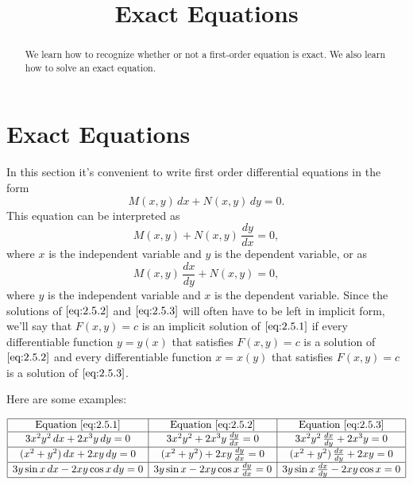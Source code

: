\documentclass{ximera}
\title{Exact Equations}
\begin{document}
 
\begin{abstract}
We learn how to recognize whether or not a first-order equation is exact.  We also learn how to solve an exact equation.
\end{abstract}
 
\maketitle
 
\section*{Exact Equations}
 
In this section it's convenient to write first order
differential equations in the form
\begin{equation} \label{eq:2.5.1}
M(x,y)\,dx+N(x,y)\,dy=0.
\end{equation}
This equation  can be interpreted as
\begin{equation} \label{eq:2.5.2}
M(x,y)+N(x,y)\,\frac{dy}{dx}=0,
\end{equation}
where $x$ is the independent variable and $y$ is the dependent
variable, or as
\begin{equation} \label{eq:2.5.3}
M(x,y)\,\frac{dx}{dy}+N(x,y)=0,
\end{equation}
where $y$ is the independent variable and $x$ is the dependent
variable. Since the solutions of $\eqref{eq:2.5.2}$ and $\eqref{eq:2.5.3}$ will
often have to be left in
implicit form, we'll say that $F(x,y)=c$ is an implicit solution of
$\eqref{eq:2.5.1}$ if every differentiable function $y=y(x)$ that satisfies
$F(x,y)=c$ is a solution of $\eqref{eq:2.5.2}$ and every
differentiable function $x=x(y)$ that satisfies $F(x,y)=c$ is a
solution of $\eqref{eq:2.5.3}$.
 
Here are some examples:
 

$$ 
\begin{array}{|c|c|c|} \hline
\text{Equation }\eqref{eq:2.5.1}&\text{Equation } \eqref{eq:2.5.2}&\text{Equation }\eqref{eq:2.5.3}
\\\hline
3x^2y^2\,dx+2x^3y\,dy =0 & 3x^2y^2+2x^3y\,\frac{dy}{dx} =0  &3x^2y^2\,\frac{dx}{dy}+2x^3y=0
\\\hline
(x^2+y^2)\,dx +2xy\,dy=0 &
(x^2+y^2)+2xy\,\frac{dy}{dx}=0&
(x^2+y^2)\,\frac{dx}{dy} +2xy=0
\\\hline
3y\sin x\,dx-2xy\cos x\,dy =0
&3y\sin x-2xy\cos x\,\frac{dy}{dx} =0
& 3y\sin x\,\frac{dx}{dy}-2xy\cos x  =0
\\\hline
\end{array}
$$
 
\end{document}
